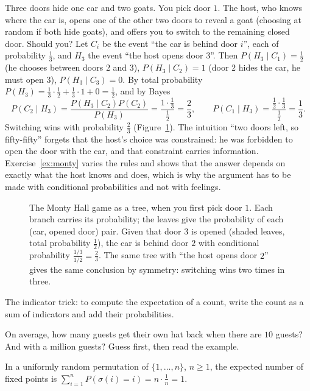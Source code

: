 \begin{examplex}
Three doors hide one car and two goats. You pick door $1$. The host, who knows where the car is, opens one of the other two doors to reveal a goat (choosing at random if both hide goats), and offers you to switch to the remaining closed door. Should you? Let $C_i$ be the event ``the car is behind door $i$'', each of probability $\frac13$, and $H_3$ the event ``the host opens door $3$''. Then $P(H_3\mid C_1)=\frac12$ (he chooses between doors $2$ and $3$), $P(H_3\mid C_2)=1$ (door $2$ hides the car, he must open $3$), $P(H_3\mid C_3)=0$. By total probability $P(H_3)=\frac13\cdot\frac12+\frac13\cdot1+0=\frac12$, and by Bayes
\[
P(C_2\mid H_3)=\frac{P(H_3\mid C_2)P(C_2)}{P(H_3)}=\frac{1\cdot\frac13}{\frac12}=\frac23,\qquad P(C_1\mid H_3)=\frac{\frac12\cdot\frac13}{\frac12}=\frac13 .
\]
Switching wins with probability $\frac23$ (Figure~\ref{fig:monty}). The intuition ``two doors left, so fifty-fifty'' forgets that the host's choice was constrained: he was forbidden to open the door with the car, and that constraint carries information. Exercise~\ref{ex:monty} varies the rules and shows that the answer depends on exactly what the host knows and does, which is why the argument has to be made with conditional probabilities and not with feelings.
\end{examplex}

\begin{figure}[ht]
\centering
{}
\caption{The Monty Hall game as a tree, when you first pick door $1$. Each branch carries its probability; the leaves give the probability of each (car, opened door) pair. Given that door $3$ is opened (shaded leaves, total probability $\frac12$), the car is behind door $2$ with conditional probability $\frac{1/3}{1/2}=\frac23$. The same tree with ``the host opens door $2$'' gives the same conclusion by symmetry: switching wins two times in three.}
\label{fig:monty}
\end{figure}

The indicator trick: to compute the expectation of a count, write the count as a sum of indicators and add their probabilities.

\begin{think}
On average, how many guests get their own hat back when there are $10$ guests? And with a million guests? Guess first, then read the example.
\end{think}

\begin{example}
In a uniformly random permutation of $\{1,\dots,n\}$, $n\ge1$, the expected number of fixed points is $\sum_{i=1}^nP(\sigma(i)=i)=n\cdot\frac1n=1$.
\end{example}

